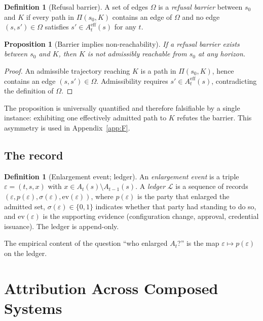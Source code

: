 \documentclass[11pt]{article}
\newtheorem{proposition}[theorem]{Proposition}
\theoremstyle{definition}
\newtheorem{definition}[theorem]{Definition}
\begin{document}
\begin{definition}[Refusal barrier]
A set of edges $\Omega$ is a \emph{refusal barrier} between $s_0$ and $K$ if every path in $\Pi(s_0,K)$ contains an edge of $\Omega$ and no edge $(s,s')\in\Omega$ satisfies $s'\in A_t^{\mathrm{eff}}(s)$ for any $t$.
\end{definition}

\begin{proposition}[Barrier implies non-reachability]\label{prop:A2}
If a refusal barrier exists between $s_0$ and $K$, then $K$ is not admissibly reachable from $s_0$ at any horizon.
\end{proposition}
\begin{proof}
An admissible trajectory reaching $K$ is a path in $\Pi(s_0,K)$, hence contains an edge $(s,s')\in\Omega$. Admissibility requires $s'\in A_t^{\mathrm{eff}}(s)$, contradicting the definition of $\Omega$.
\end{proof}

The proposition is universally quantified and therefore falsifiable by a single instance: exhibiting one effectively admitted path to $K$ refutes the barrier. This asymmetry is used in Appendix~\ref{app:F}.

\subsection{The record}

\begin{definition}[Enlargement event; ledger]
An \emph{enlargement event} is a triple $\varepsilon=(t,s,x)$ with $x\in A_t(s)\setminus A_{t-1}(s)$. A \emph{ledger} $\mathcal{L}$ is a sequence of records $(\varepsilon,p(\varepsilon),\sigma(\varepsilon),\mathrm{ev}(\varepsilon))$, where $p(\varepsilon)$ is the party that enlarged the admitted set, $\sigma(\varepsilon)\in\{0,1\}$ indicates whether that party had standing to do so, and $\mathrm{ev}(\varepsilon)$ is the supporting evidence (configuration change, approval, credential issuance). The ledger is append-only.
\end{definition}

The empirical content of the question ``who enlarged $A_t$?'' is the map $\varepsilon\mapsto p(\varepsilon)$ on the ledger.

\section{Attribution Across Composed Systems}\label{app:B}
\end{document}

